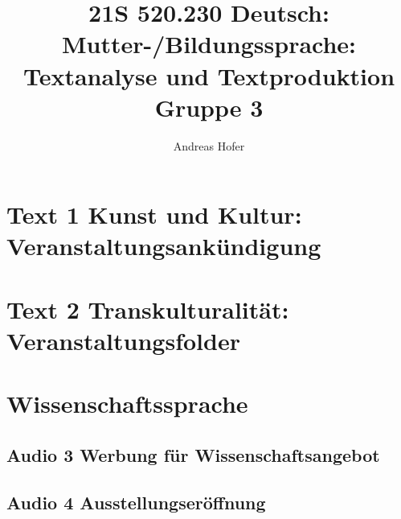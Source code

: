 \documentclass{article}
\title{\vspace{-3cm}21S 520.230 Deutsch: Mutter-/Bildungssprache: Textanalyse und Textproduktion Gruppe 3}
\author{Andreas Hofer}
\begin{document}
	\maketitle
	\section{\textbf{Text 1} Kunst und Kultur: Veranstaltungsankündigung}
	\section{\textbf{Text 2} Transkulturalität: Veranstaltungsfolder}
	\section{Wissenschaftssprache}
	\subsection{\textbf{Audio 3} Werbung für Wissenschaftsangebot}
	\subsection{\textbf{Audio 4} Ausstellungseröffnung}
	
\end{document}
